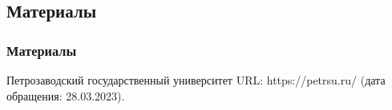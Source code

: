 \subsection{Материалы}

\begin{frame} 
	\frametitle{Материалы}
	\begin{thebibliography}{99}
		\footnotesize 		
		 Петрозаводский государственный университет URL: https://petrsu.ru/ (дата обращения: 28.03.2023).

 \end{thebibliography}
\end{frame}